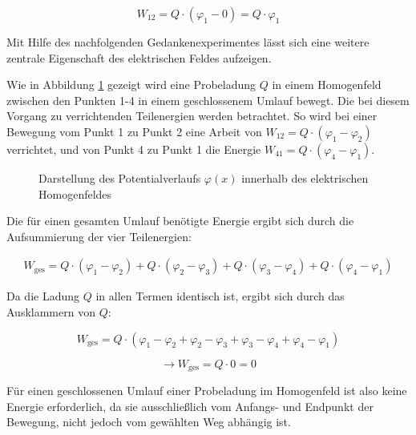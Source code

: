 \begin{frame}
{	\begin{equation*}
		W_{12} = Q \cdot (\varphi_1 - 0) = Q \cdot \varphi_1
	\end{equation*}


	Mit Hilfe des nachfolgenden Gedankenexperimentes lässt sich eine weitere zentrale Eigenschaft des elektrischen Feldes aufzeigen.

	Wie in Abbildung \ref{fig:wirbelfrei} gezeigt wird eine Probeladung $Q$ in einem Homogenfeld 
	zwischen den Punkten 1-4 in einem geschlossenem Umlauf bewegt. Die bei diesem Vorgang zu verrichtenden Teilenergien werden betrachtet.
	So wird bei einer Bewegung vom Punkt 1 zu Punkt 2 eine Arbeit von $W_{12} = Q \cdot (\varphi_1 - \varphi_2)$ verrichtet, 
	und von Punkt 4 zu Punkt 1 die Energie $W_{41} = Q \cdot (\varphi_4 - \varphi_1)$.


	\begin{figure}[h!]
		\centering
		
		\caption{Darstellung des Potentialverlaufs $\varphi(x)$ innerhalb des elektrischen Homogenfeldes}
		\label{fig:wirbelfrei}
	\end{figure}



	Die für einen gesamten Umlauf benötigte Energie ergibt sich durch die Aufsummierung der vier Teilenergien: 

	
	\begin{equation*}
		\begin{split}
			W_\mathrm{ges} = Q \cdot (\varphi_1 - \varphi_2) + Q \cdot (\varphi_2 - \varphi_3)
			+ Q \cdot (\varphi_3 - \varphi_4) + Q \cdot (\varphi_4 - \varphi_1)
		\end{split}
	\end{equation*}

	Da die Ladung $Q$ in allen Termen identisch ist, ergibt sich durch das Ausklammern von $Q$:


	\begin{equation*}
			W_\mathrm{ges} = Q \cdot (\varphi_1 - \varphi_2 + \varphi_2 - \varphi_3
			+ \varphi_3 - \varphi_4 + \varphi_4 - \varphi_1) 
	\end{equation*}
	
	\begin{equation*}
		\rightarrow W_\mathrm{ges} = Q \cdot 0 = 0
	\end{equation*}

	Für einen geschlossenen Umlauf einer Probeladung im Homogenfeld ist also keine Energie erforderlich,
	 da sie ausschließlich vom Anfangs- und Endpunkt der Bewegung, nicht jedoch vom gewählten Weg abhängig ist. 

}
\end{frame}
